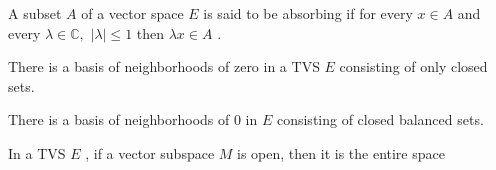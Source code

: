 \begin{defn}
	A subset $ A $ of a vector space $ E $ is said to be absorbing if for every $ x \in A $ and every $ \lambda \in \mathbb{C}, \hspace{4pt} \vert \lambda \vert \leq 1 $ then $ \lambda x \in A $ .
\end{defn}

\begin{prop}
	There is a basis of neighborhoods of zero in a TVS $ E $ consisting of only closed sets.
\end{prop}

\begin{cor}
	There is a basis of neighborhoods of 0 in $ E $ consisting of closed balanced sets.
\end{cor}

\begin{prop}
	In a TVS $ E $ , if a vector subspace $ M $ is open, then it is the entire space
\end{prop}



